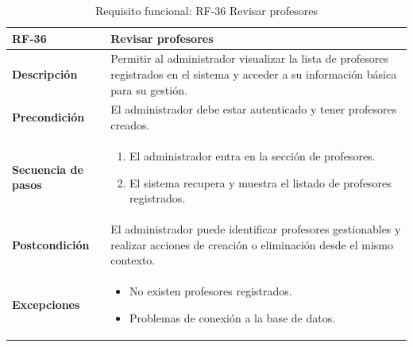 \begin{table}[H]
\centering
\begin{tabularx}{\textwidth}{
  |>{\centering\arraybackslash}l
  |>{\centering\arraybackslash}X|}
\hline
\textbf{RF-36} & \textbf{Revisar profesores} \\ \hline
\textbf{Descripción} & Permitir al administrador visualizar la lista de profesores registrados en el sistema y acceder a su información básica para su gestión. \\ \hline
\textbf{Precondición} & El administrador debe estar autenticado y tener profesores creados. \\ \hline
\textbf{Secuencia de pasos} &
\begin{enumerate}
  \item El administrador entra en la sección de profesores.
  \item El sistema recupera y muestra el listado de profesores registrados.
\end{enumerate} \\ \hline
\textbf{Postcondición} & El administrador puede identificar profesores gestionables y realizar acciones de creación o eliminación desde el mismo contexto. \\ \hline
\textbf{Excepciones} &
\begin{itemize}
  \item No existen profesores registrados.
  \item Problemas de conexión a la base de datos.
\end{itemize} \\ \hline
\end{tabularx}
\caption{Requisito funcional: RF-36 Revisar profesores}
\end{table}

